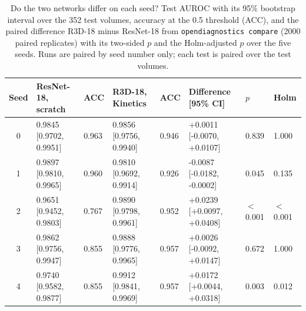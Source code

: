 \begin{table}[t]
\caption{Do the two networks differ on each seed? Test AUROC with its 95\% bootstrap interval over the 352 test volumes, accuracy at the 0.5 threshold (ACC), and the paired difference R3D-18 minus ResNet-18 from \texttt{opendiagnostics compare} (2000 paired replicates) with its two-sided $p$ and the Holm-adjusted $p$ over the five seeds. Runs are paired by seed number only; each test is paired over the test volumes.}
\label{tab:seeds}
\centering
\footnotesize
\setlength{\tabcolsep}{3pt}
\begin{tabular}{@{}clllllll@{}}
\toprule
Seed & ResNet-18, scratch & ACC & R3D-18, Kinetics & ACC & Difference [95\% CI] & $p$ & Holm \\
\midrule
0 & 0.9845 [0.9702, 0.9951] & 0.963 & 0.9856 [0.9756, 0.9940] & 0.946 & +0.0011 [-0.0070, +0.0107] & 0.839 & 1.000 \\
1 & 0.9897 [0.9810, 0.9965] & 0.960 & 0.9810 [0.9692, 0.9914] & 0.926 & -0.0087 [-0.0182, -0.0002] & 0.045 & 0.135 \\
2 & 0.9651 [0.9452, 0.9803] & 0.767 & 0.9890 [0.9798, 0.9961] & 0.952 & +0.0239 [+0.0097, +0.0408] & $<$0.001 & $<$0.001 \\
3 & 0.9862 [0.9756, 0.9947] & 0.855 & 0.9888 [0.9776, 0.9965] & 0.957 & +0.0026 [-0.0092, +0.0147] & 0.672 & 1.000 \\
4 & 0.9740 [0.9582, 0.9877] & 0.855 & 0.9912 [0.9841, 0.9969] & 0.957 & +0.0172 [+0.0044, +0.0318] & 0.003 & 0.012 \\
\bottomrule
\end{tabular}
\end{table}

